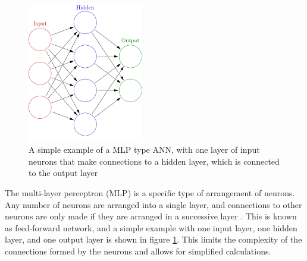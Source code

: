 \begin{figure}[hbtp]
 \begin{center}
   \includegraphics[width=0.45\textwidth]{Figures/Analysis_1_Diagrams/ANN_simple.png}
   \caption{A simple example of a MLP type ANN, with one layer of
     input neurons that make connections to a hidden layer, which is
     connected to the output layer \cite{ANN_basic_image}}
   \label{fig:mlp_simple}
 \end{center}
\end{figure}

\par The multi-layer perceptron (MLP) is a specific type of
arrangement of neurons.  Any number of neurons are arranged into a
single layer, and connections to other neurons are only made if they
are arranged in a successive layer \cite{Hocker:2007ht}.  This is
known as feed-forward network, and a simple example with one input
layer, one hidden layer, and one output layer is shown in figure
\ref{fig:mlp_simple}.  This limits the complexity of the connections
formed by the neurons and allows for simplified calculations.  

